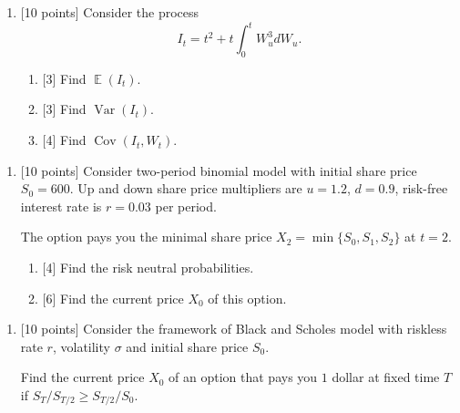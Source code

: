 \documentclass[12pt]{article} %
\theoremstyle{definition} %
\DeclareMathOperator{\Cov}{Cov}
\DeclareMathOperator{\Var}{Var}
\DeclareMathOperator{\E}{\mathbb{E}}
\newcommand \putyourname{\fbox{
    \begin{minipage}{42em}
      Name, group no:\vspace*{3ex}\par
      \noindent\dotfill\vspace{2mm}
    \end{minipage}
  }
}
\begin{document}
\begin{enumerate}[resume]
    \item {[10 points]} Consider the process
    \[
        I_t = t^2 + t\int_0^t W_u^3 dW_u.
    \]
    \begin{enumerate}
    \item {[3]} Find $\E(I_t)$.
    \item {[3]} Find $\Var(I_t)$.
    \item {[4]} Find $\Cov(I_t, W_t)$.
    \end{enumerate} 

\end{enumerate}
    
 

\begin{enumerate}[resume]
\item {[10 points]} Consider two-period binomial model with initial share price $S_0 = 600$. 
Up and down share price multipliers are $u=1.2$, $d=0.9$, risk-free interest rate is $r = 0.03$ per period. 

The option pays you the minimal share price $X_2 = \min\{S_0, S_1, S_2\}$ at $t=2$.

\begin{enumerate}
    \item {[4]} Find the risk neutral probabilities. 
    \item {[6]} Find the current price $X_0$ of this option. 
\end{enumerate}
\end{enumerate}
 

\begin{enumerate}[resume]
\item {[10 points]}  Consider the framework of Black and Scholes model with riskless rate $r$, 
volatility $\sigma$ and initial share price $S_0$. 

Find the current price $X_0$ of an option that pays you $1$ dollar at fixed time $T$ if $S_T / S_{T/2} \geq S_{T/2} / S_0$.


\end{enumerate}
\end{document}

